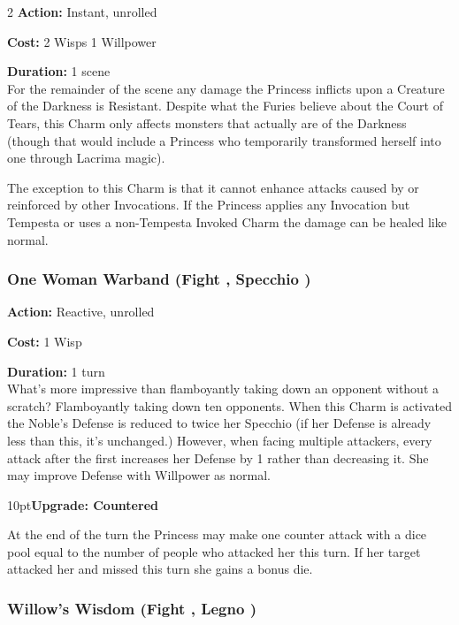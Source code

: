\begin{multicols}{2}
\noindent \textbf{Action:} Instant, unrolled

\noindent \textbf{Cost:} 2 Wisps 1 Willpower

\noindent \textbf{Duration:} 1 scene\\

For the remainder of the scene any damage the Princess inflicts upon a Creature of the Darkness is Resistant. Despite what the Furies believe about the Court of Tears, this Charm only affects monsters that actually are of the Darkness (though that would include a Princess who temporarily transformed herself into one through Lacrima magic). 

The exception to this Charm is that it cannot enhance attacks caused by or reinforced by other Invocations. If the Princess applies any Invocation but Tempesta or uses a non-Tempesta Invoked Charm the damage can be healed like normal. 

\subsubsection*{One Woman Warband (Fight \textbullet\textbullet, Specchio \textbullet\textbullet\textbullet)}

\noindent \textbf{Action:} Reactive, unrolled

\noindent \textbf{Cost:} 1 Wisp

\noindent \textbf{Duration:} 1 turn\\

\noindent What's more impressive than flamboyantly taking down an opponent without a scratch? Flamboyantly taking down ten opponents. When this Charm is activated the Noble’s Defense is reduced to twice her Specchio (if her Defense is already less than this, it’s unchanged.) However, when facing multiple attackers, every attack after the first increases her Defense by 1 rather than decreasing it. She may improve Defense with Willpower as normal.

\begin{myindentpar}{10pt}\textbf{Upgrade: Countered}

At the end of the turn the Princess may make one counter attack with a dice pool equal to the number of people who attacked her this turn. If her target attacked her and missed this turn she gains a bonus die.\end{myindentpar}

\subsubsection*{Willow’s Wisdom (Fight \textbullet\textbullet, Legno \textbullet\textbullet)}


\end{multicols}
